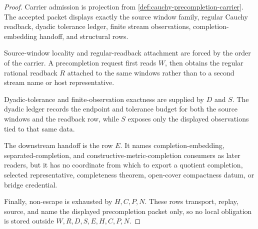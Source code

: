 \begin{proof}
Carrier admission is projection from \autoref{def:cauchy-precompletion-carrier}. The accepted packet displays exactly the source window family, regular Cauchy readback, dyadic tolerance ledger, finite stream observations, completion-embedding handoff, and structural rows.

Source-window locality and regular-readback attachment are forced by the order of the carrier. A precompletion request first reads $W$, then obtains the regular rational readback $R$ attached to the same windows rather than to a second stream name or host representative.

Dyadic-tolerance and finite-observation exactness are supplied by $D$ and $S$. The dyadic ledger records the endpoint and tolerance budget for both the source windows and the readback row, while $S$ exposes only the displayed observations tied to that same data.

The downstream handoff is the row $E$. It names completion-embedding, separated-completion, and constructive-metric-completion consumers as later readers, but it has no coordinate from which to export a quotient completion, selected representative, completeness theorem, open-cover compactness datum, or bridge credential.

Finally, non-escape is exhausted by $H,C,P,N$. These rows transport, replay, source, and name the displayed precompletion packet only, so no local obligation is stored outside $W,R,D,S,E,H,C,P,N$.
\end{proof}

